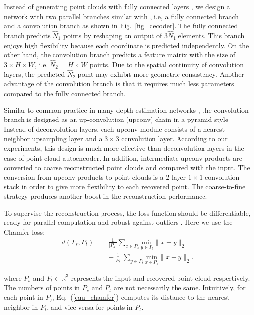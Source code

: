 \documentclass[10pt,twocolumn,letterpaper]{article}
\begin{document}
Instead of generating point clouds with fully connected layers \cite{achlioptas2017learning}, we design a network with two parallel branches similar with \cite{fan2016point}, i.e, a fully connected branch and a convolution branch as shown in Fig.~\ref{fig_decoder}. The fully connected branch predicts $\hat{N}_1$ points by reshaping an output of $3\hat{N}_1$ elements. This branch enjoys high flexibility because each coordinate is predicted independently. On the other hand, the convolution branch predicts a feature matrix with the size of $3\times H\times W$, i.e. $\hat{N}_2=H\times W$ points. Due to the spatial continuity of convolution layers, the predicted $\hat{N}_2$ point may exhibit more geometric consistency. Another advantage of the convolution branch is that it requires much less parameters compared to the fully connected branch.

Similar to common practice in many depth estimation networks \cite{garg2016unsupervised,godard2016unsupervised}, the convolution branch is designed as an up-convolution (upconv) chain in a pyramid style. Instead of deconvolution layers, each upconv module consists of a nearest neighbor upsampling layer and a $3\times3$ convolution layer. According to our experiments, this design is much more effective than deconvolution layers in the case of point cloud autoencoder. In addition, intermediate upconv products are converted to coarse reconstructed point clouds and compared with the input. The conversion from upconv products to point clouds is a 2-layer $1\times 1$ convolution stack in order to give more flexibility to each recovered point. The coarse-to-fine strategy produces another boost in the reconstruction performance.

To supervise the reconstruction process, the loss function should be differentiable, ready for parallel computation and robust against outliers \cite{fan2016point}. Here we use the Chamfer loss: 
\begin{equation}\label{equ_chamfer}
\begin{split}
    d(P_s, P_t) = & \frac{1}{|P_s|}\sum_{x\in P_s} \underset{y\in P_t}{\text{min}}\|x-y\|_2 \\
                  & + \frac{1}{|P_t|}\sum_{y\in P_t} \underset{x\in P_s}{\text{min}}\|x-y\|_2.
\end{split}
\end{equation}

\noindent where $P_s$ and $P_t \in \mathbb{R}^3$ represents the input and recovered point cloud respectively. The numbers of points in $P_s$ and $P_t$ are not necessarily the same. Intuitively, for each point in $P_s$, Eq.~(\ref{equ_chamfer}) computes its distance to the nearest neighbor in $P_t$, and vice versa for points in $P_t$. %
\end{document}

